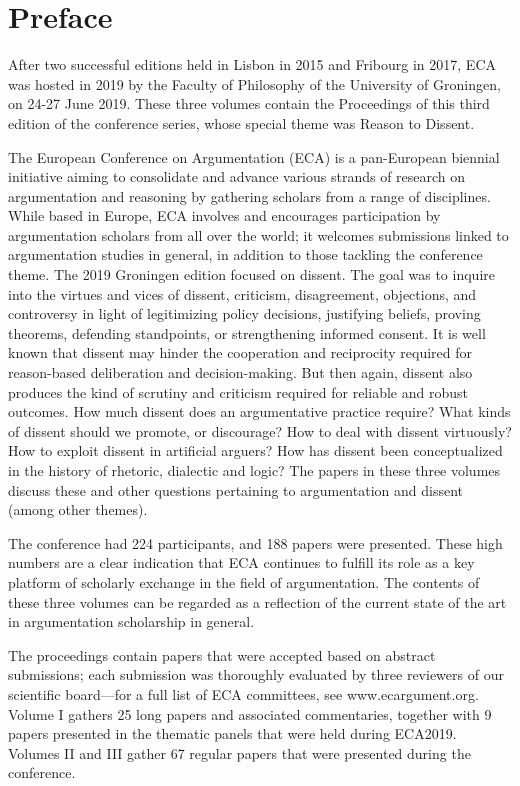 \section*{Preface}

After two successful editions held in Lisbon in 2015 and Fribourg in 2017, ECA was hosted in 2019 by the Faculty of Philosophy of the University of Groningen, on 24-27 June 2019. These three volumes contain the Proceedings of this third edition of the conference series, whose special theme was Reason to Dissent.

The European Conference on Argumentation (ECA) is a pan-European biennial initiative aiming to consolidate and advance various strands of research on argumentation and reasoning by gathering scholars from a range of disciplines. While based in Europe, ECA involves and encourages participation by argumentation scholars from all over the world; it welcomes submissions linked to argumentation studies in general, in addition to those tackling the conference theme. The 2019 Groningen edition focused on dissent. The goal was to inquire into the virtues and vices of dissent, criticism, disagreement, objections, and controversy in light of legitimizing policy decisions, justifying beliefs, proving theorems, defending standpoints, or strengthening informed consent. It is well known that dissent may hinder the cooperation and reciprocity required for reason-based deliberation and decision-making. But then again, dissent also produces the kind of scrutiny and criticism required for reliable and robust outcomes. How much dissent does an argumentative practice require? What kinds of dissent should we promote, or discourage? How to deal with dissent virtuously? How to exploit dissent in artificial arguers? How has dissent been conceptualized in the history of rhetoric, dialectic and logic? The papers in these three volumes discuss these and other questions pertaining to argumentation and dissent (among other themes).

The conference had 224 participants, and 188 papers were presented. These high numbers are a clear indication that ECA continues to fulfill its role as a key platform of scholarly exchange in the field of argumentation. The contents of these three volumes can be regarded as a reflection of the current state of the art in argumentation scholarship in general.

The proceedings contain papers that were accepted based on abstract submissions; each submission was thoroughly evaluated by three reviewers of our scientific board—for a full list of ECA committees, see www.ecargument.org. Volume I gathers 25 long papers and associated commentaries, together with 9 papers presented in the thematic panels that were held during ECA2019. Volumes II and III gather 67 regular papers that were presented during the conference. 

